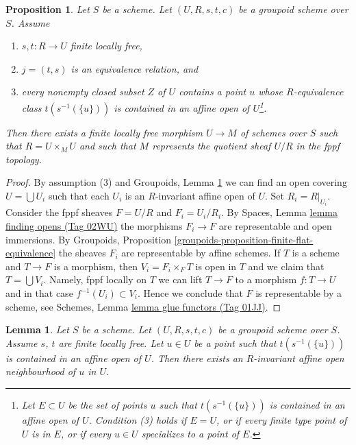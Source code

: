\documentclass{amsart}
\theoremstyle{plain}
\newtheorem{proposition}[subsection]{Proposition}
\newtheorem{lemma}[subsection]{Lemma}
\theoremstyle{definition}
\theoremstyle{remark}
\numberwithin{equation}{subsection}
\begin{document}
\begin{proposition}
\label{spaces-properties-proposition-finite-flat-equivalence-global}
Let $S$ be a scheme.
Let $(U, R, s, t, c)$ be a groupoid scheme over $S$.
Assume
\begin{enumerate}
\item $s, t : R \to U$ finite locally free,
\item $j = (t, s)$ is an equivalence relation, and
\item every nonempty closed subset $Z$ of $U$ contains a point
$u$ whose $R$-equivalence class $t(s^{-1}(\{u\}))$ is contained
in an affine open of $U$\footnote{Let $E \subset U$ be the
set of points $u$ such that $t(s^{-1}(\{u\}))$
is contained in an affine open of $U$. Condition (3) holds
if $E = U$, or if every finite type point of $U$ is in $E$, or
if every $u \in U$ specializes to a point of $E$.}.
\end{enumerate}
Then there exists a finite locally free morphism $U \to M$
of schemes over $S$ such that $R = U \times_M U$ and such that $M$
represents the quotient sheaf $U/R$ in the fppf topology.
\end{proposition}

\begin{proof}
By assumption (3) and
Groupoids, Lemma \ref{groupoids-lemma-find-invariant-affine}
we can find an open covering $U = \bigcup U_i$ such that each $U_i$
is an $R$-invariant affine open of $U$. Set $R_i = R|_{U_i}$.
Consider the fppf sheaves $F = U/R$ and $F_i = U_i/R_i$.
By Spaces, Lemma \href{https://stacks.math.columbia.edu/tag/02WU}{lemma finding opens (Tag 02WU)} the morphisms
$F_i \to F$ are representable and open immersions.
By Groupoids, Proposition \ref{groupoids-proposition-finite-flat-equivalence}
the sheaves $F_i$ are representable by affine schemes.
If $T$ is a scheme and $T \to F$ is a morphism, then $V_i = F_i \times_F T$
is open in $T$ and we claim that $T = \bigcup V_i$. Namely,
fppf locally on $T$ we can lift $T \to F$ to a morphism
$f : T \to U$ and in that case $f^{-1}(U_i) \subset V_i$.
Hence we conclude that $F$ is representable by a scheme, see
Schemes, Lemma \href{https://stacks.math.columbia.edu/tag/01JJ}{lemma glue functors (Tag 01JJ)}.
\end{proof}


\begin{lemma}
\label{groupoids-lemma-find-invariant-affine}
Let $S$ be a scheme.
Let $(U, R, s, t, c)$ be a groupoid scheme over $S$.
Assume $s$, $t$ are finite locally free.
Let $u \in U$ be a point such that $t(s^{-1}(\{u\}))$
is contained in an affine open of $U$.
Then there exists an $R$-invariant affine open neighbourhood
of $u$ in $U$.
\end{lemma}
\end{document}
